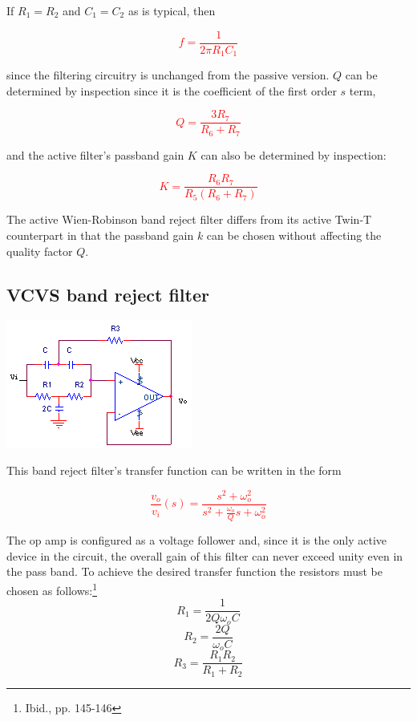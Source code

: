 If $R_{1} = R_{2}$ and $C_{1} = C_{2}$ as is typical, then

\textcolor{red}{
\begin{equation}
f = \frac{1}{2\pi R_{1}C_{1}}
\end{equation}
}

since the filtering circuitry is unchanged from the passive version. $Q$ can be determined by inspection since it is the coefficient of the first order $s$ term,

\textcolor{red}{
\begin{equation}
Q = \frac{3R_{7}}{R_{6}+R_{7}}
\end{equation}
}

and the active filter's passband gain $K$ can also be determined by inspection:

\textcolor{red}{
\begin{equation}
K = \frac{R_{6}R_{7}}{R_{5}(R_{6}+R_{7})}
\end{equation}
}

The active Wien-Robinson band reject filter differs from its active Twin-T counterpart in that the passband gain $k$ can be chosen without affecting the quality factor $Q$.

\subsection{VCVS band reject filter}
\begin{center}
	\includegraphics{schematics/vcvs_bandreject.PNG}
\end{center}
This band reject filter's transfer function can be written in the form

\textcolor{red}{
\begin{equation}
\frac{v_{o}}{v_{i}}(s) = \frac{s^{2} + \omega_{o}^{2}}{s^{2} + \frac{\omega_{o}}{Q}s + \omega_{o}^{2}}
\label{eq:vcvs_bandreject}
\end{equation}
}

The op amp is configured as a voltage follower and, since it is the only active device in the circuit, the overall gain of this filter can never exceed unity even in the pass band. To achieve the desired transfer function the resistors must be chosen as follows:\footnote{Ibid., pp. 145-146}
\begin{equation}
R_{1} = \frac{1}{2Q\omega_{o}C}
\end{equation}
\begin{equation}
R_{2} = \frac{2Q}{\omega_{o}C}
\end{equation}
\begin{equation}
R_{3} = \frac{R_{1}R_{2}}{R_{1}+R_{2}}
\end{equation}

